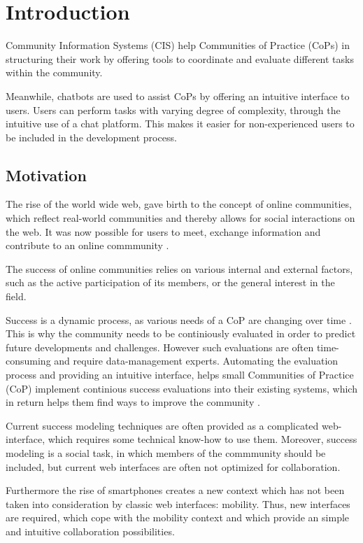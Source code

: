 \chapter{Introduction}
Community Information Systems (CIS) help Communities of Practice (CoPs) in structuring their work by offering tools to coordinate and evaluate different tasks within the community.

Meanwhile, chatbots are used to assist CoPs by offering an intuitive interface to users. Users can perform tasks with varying degree of complexity, through the intuitive use of a chat platform. This makes it easier for non-experienced users to be included in the development process.

\section{Motivation}
The rise of the world wide web, gave birth to the concept of online communities, which reflect real-world communities and thereby allows for social interactions on the web. It was now possible for users to meet, exchange information and contribute to an online commmunity \cite{Renz08}.

The success of online communities relies on various internal and external factors, such as the active participation of its members, or the general interest in the field.

Success is a dynamic process, as various needs of a CoP are changing over time \cite{Renz08,GKJa08}. This is why the community needs to be continiously evaluated in order to predict future developments and challenges. However such evaluations are often time-consuming and require data-management experts. Automating the evaluation process and providing an intuitive interface, helps small Communities of Practice (CoP) implement continious success evaluations into their existing systems, which in return helps them find ways to improve the community \cite{Renz08}.

Current success modeling techniques are often provided as a complicated web-interface, which requires some technical know-how to use them. Moreover, success modeling is a social task, in which members of the commmunity should be included, but current web interfaces are often not optimized for collaboration.

Furthermore the rise of smartphones creates a new context which has not been taken into consideration by classic web interfaces: mobility.
Thus, new interfaces are required, which cope with the mobility context and which provide an simple and intuitive collaboration possibilities.
\newpage

